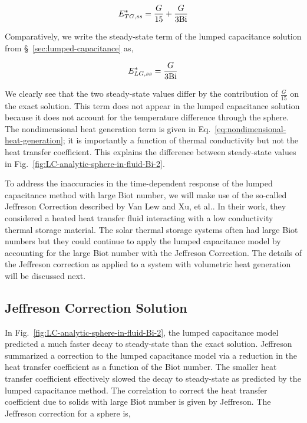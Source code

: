 \begin{equation}
	E^*_{TG,ss}=\frac{G}{15}+\frac{G}{3\mathrm{Bi}}
\end{equation}

Comparatively, we write the steady-state term of the lumped capacitance solution from \S~\ref{sec:lumped-capacitance} as,

\begin{equation}
	E^*_{LG,ss} = \frac{G}{3\mathrm{Bi}}
\end{equation}

We clearly see that the two steady-state values differ by the contribution of $\frac{G}{15}$ on the exact solution. This term does not appear in the lumped capacitance solution because it does not account for the temperature difference through the sphere. The nondimensional heat generation term is given in Eq.~\ref{eq:nondimensional-heat-generation}; it is importantly a function of thermal conductivity but not the heat transfer coefficient. This explains the difference between steady-state values in Fig.~\ref{fig:LC-analytic-sphere-in-fluid-Bi-2}.

To address the inaccuracies in the time-dependent response of the lumped capacitance method with large Biot number, we will make use of the so-called Jeffreson Correction described by Van Lew\cite{VanLew2010} and Xu, et al.\cite{Xu2012}. In their work, they considered a heated heat transfer fluid interacting with a low conductivity thermal storage material. The solar thermal storage systems often had large Biot numbers but they could continue to apply the lumped capacitance model by accounting for the large Biot number with the Jeffreson Correction\cite{jeffreson409}. The details of the Jeffreson correction as applied to a system with volumetric heat generation will be discussed next.





\subsection{Jeffreson Correction Solution}
In Fig.~\ref{fig:LC-analytic-sphere-in-fluid-Bi-2}, the lumped capacitance model predicted a much faster decay to steady-state than the exact solution. Jeffreson summarized a correction to the lumped capacitance model via a reduction in the heat transfer coefficient as a function of the Biot number. The smaller heat transfer coefficient effectively slowed the decay to steady-state as predicted by the lumped capacitance method.
The correlation to correct the heat transfer coefficient due to solids with large Biot number is given by Jeffreson\cite{jeffreson409}. The Jeffreson correction for a sphere is,

